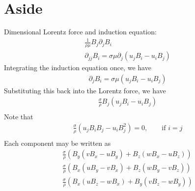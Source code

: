 \documentclass[11pt]{article}
\newcommand{\PD}{\partial}
\begin{document}
\newpage
\section{Aside}
Dimensional Lorentz force and induction equation:
\begin{equation}\begin{aligned}
\frac{1}{\rho \mu} B_j \PD_j B_i \\
\PD_{jj} B_i = \sigma \mu \PD_j (u_j B_i - u_i B_j)
\end{aligned}\end{equation}
Integrating the induction equation once, we have
\begin{equation}\begin{aligned}
\PD_{j} B_i = \sigma \mu (u_j B_i - u_i B_j)
\end{aligned}\end{equation}
Substituting this back into the Lorentz force, we have
\begin{equation}\begin{aligned}
\frac{\sigma}{\rho} B_j (u_j B_i - u_i B_j) \\
\end{aligned}\end{equation}
Note that
\begin{equation}\begin{aligned}
\frac{\sigma}{\rho} (u_j B_i B_j - u_i B_j^2) = 0 , \qquad \text{if $i = j$} \\
\end{aligned}\end{equation}
Each component may be written as
\begin{equation}\begin{aligned}
\frac{\sigma}{\rho} (B_y (v B_x - u B_y) + B_z (w B_x - u B_z)) \\
\frac{\sigma}{\rho} (B_x (u B_y - v B_x) + B_z (w B_y - v B_z)) \\
\frac{\sigma}{\rho} (B_x (u B_z - w B_x) + B_y (v B_z - w B_y)) \\
\end{aligned}\end{equation}
\end{document}
